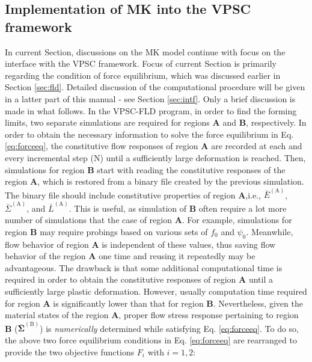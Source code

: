 \documentclass[12pt]{amsart}
\begin{document}
\subsection{Implementation of MK into the VPSC framework}
\label{sec:imple}
In current Section, discussions on the MK model continue with focus on the interface with the VPSC framework.
Focus of current Section is primarily regarding the condition of force equilibrium, which was discussed earlier in Section \ref{sec:fld}.
Detailed discussion of the computational procedure will be given in a latter part of this manual - see Section \ref{sec:intf}.
Only a brief discussion is made in what follows.
\newline
In the VPSC-FLD program, in order to find the forming limits, two separate simulations are required for regions \textbf{A} and \textbf{B}, respectively.
In order to obtain the necessary information to solve the force equilibrium in Eq. \ref{eq:forceeq},
the constitutive flow responses of region \textbf{A} are recorded at each and every incremental step (N) until a sufficiently large deformation is reached.
Then, simulations for region \textbf{B} start with reading the constitutive responses of the region \textbf{A}, which is restored from a binary file created by the previous simulation.
The binary file should include constitutive properties of region \textbf{A},i.e., $\bar{E}^\mathrm{(A)}$, $\bar{\Sigma}^\mathrm{(A)}$, and $\bar{L}^\mathrm{(A)}$.
\newline
This is useful, as simulation of \textbf{B} often require a lot more number of simulations that the case of region \textbf{A}.
For example, simulations for region \textbf{B} may require probings based on various sets of $f_0$ and $\psi_0$.
Meanwhile, flow behavior of region \textbf{A} is independent of these values, thus saving flow behavior of the region \textbf{A} one time and reusing it repeatedly may be advantageous.
The drawback is that some additional computational time is required in order to obtain the constitutive responses of region \textbf{A} until a sufficiently large plastic deformation.
However, usually computation time required for region \textbf{A} is significantly lower than that for region \textbf{B}.
\newline
Nevertheless, given the material states of the region \textbf{A},
proper flow stress response pertaining to region \textbf{B} ($\bar{\mathbf{\Sigma}}^\mathrm{(B)}$) is \emph{numerically} determined while satisfying Eq. \ref{eq:forceeq}.
To do so, the above two force equilibrium conditions in Eq. \ref{eq:forceeq} are rearranged to provide the two objective functions $F_{i}$ with $i=1, 2$:
\end{document}
